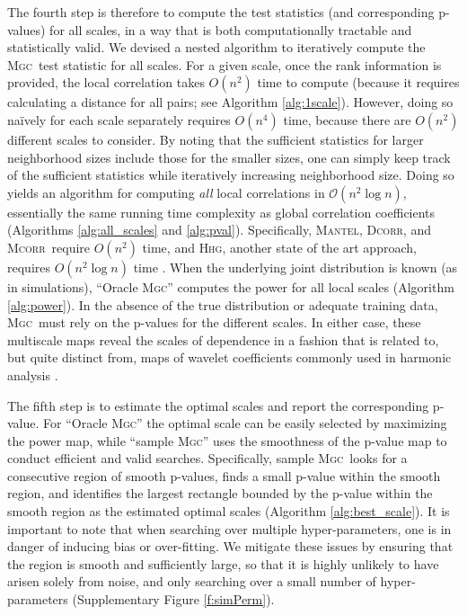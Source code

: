 \documentclass[11pt]{article}
\newcommand{\note}[2][]{\added[#1,remark={#2}]{}}
\providecommand{\sct}[1]{{\normalfont\textsc{#1}}}
\providecommand{\mc}[1]{\mathcal{#1}}
\newcommand{\Mgc}{\sct{Mgc}}
\newcommand{\Hhg}{\sct{Hhg}}
\newcommand{\Dcorr}{\sct{Dcorr}}
\newcommand{\Mcorr}{\sct{Mcorr}}
\newcommand{\Mantel}{\sct{Mantel}}
\newcommand{\jv}[1]{{\note{jv: #1}}}
\begin{document}
The fourth step is therefore to compute the test statistics (and corresponding p-values) for all scales, in a way that is both computationally tractable and statistically valid.
We devised a nested algorithm to iteratively compute the \Mgc~test statistic for all scales.  
For a given scale, once the rank information is provided, the local correlation takes $O(n^2)$ time to compute (because it requires calculating a distance for all pairs; see Algorithm \ref{alg:1scale}). 
% 
However, doing so na\"ively for each scale separately requires $O(n^4)$ time, because there are $O(n^2)$ different scales to consider. 
% 
By noting that the sufficient statistics for larger neighborhood sizes include those for the smaller sizes, one can simply keep track of the sufficient statistics while iteratively increasing neighborhood size. 
Doing so yields an algorithm for computing \emph{all} local correlations in $\mc{O}(n^2 \log n)$, essentially the same running time complexity as  global correlation coefficients (Algorithms \ref{alg:all_scales} and \ref{alg:pval}). Specifically, \Mantel, \Dcorr, and \Mcorr~require $O(n^2)$ time, and \Hhg, another state of the art approach,  requires $O(n^2 \log n)$ time \cite{HellerGorfine2013}.
% 
When the underlying joint distribution is known (as in simulations), ``Oracle \Mgc'' computes the power for all local scales (Algorithm \ref{alg:power}). In the absence of the true distribution or adequate training data, \Mgc~must rely on the p-values for the different scales.  In either case, these multiscale maps reveal the scales of dependence in a fashion that is  related to, but quite distinct from, maps of wavelet coefficients commonly used in harmonic analysis \cite{Allard2012}.
%
%
%

The fifth step is to estimate the optimal scales and report the corresponding p-value. For ``Oracle \Mgc'' the optimal scale can be easily selected by maximizing the power map, while ``sample \Mgc'' uses the smoothness of the p-value map to conduct efficient and valid searches.
Specifically, sample \Mgc~looks for a consecutive region of smooth p-values, finds a small p-value within the smooth region, and identifies the largest rectangle bounded by the p-value within the smooth region as the estimated optimal scales (Algorithm \ref{alg:best_scale}).
It is important to note that when searching over multiple hyper-parameters, one is in danger of inducing bias or over-fitting.  We mitigate these issues by ensuring that the region is smooth and sufficiently large, so that it is  highly unlikely to have arisen solely from noise, and only searching over a small number of hyper-parameters  (Supplementary Figure \ref{f:simPerm}).
\jv{shall we define sample mgc here? As the fifth step in fact is for sample mgc. So I rephrased the above paragraph.}
\end{document}
